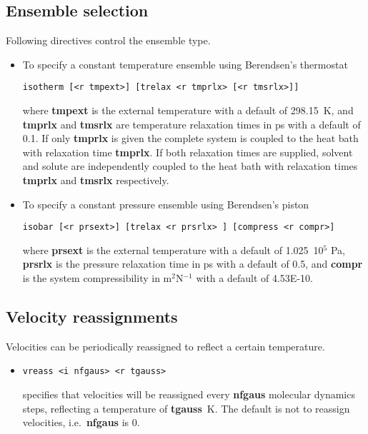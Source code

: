 \subsection{Ensemble selection}
Following directives control the ensemble type.
\begin{itemize}
\item
To specify a constant temperature ensemble using Berendsen's thermostat
\begin{verbatim}
isotherm [<r tmpext>] [trelax <r tmprlx> [<r tmsrlx>]]
\end{verbatim}
where {\bf tmpext} is the external temperature with a default of 298.15~K,
and {\bf tmprlx} and {\bf tmsrlx} are temperature relaxation times in ps 
with a default of 0.1. If only {\bf tmprlx} is given the complete system
is coupled to the heat bath with relaxation time {\bf tmprlx}. If both
relaxation times are supplied, solvent and solute are independently coupled
to the heat bath with relaxation times {\bf tmprlx} and {\bf tmsrlx}
respectively.
\item
To specify a constant pressure ensemble using Berendsen's piston
\begin{verbatim}
isobar [<r prsext>] [trelax <r prsrlx> ] [compress <r compr>]
\end{verbatim}
where {\bf prsext} is the external temperature with a default of 1.025~10$^5$ Pa,
{\bf prsrlx} is the pressure relaxation time in ps with a default of 0.5, and
{\bf compr} is the system compressibility in m$^2$N$^{-1}$ with a
default of 4.53E-10.
\end{itemize}
\subsection{Velocity reassignments}
Velocities can be periodically reassigned to reflect a certain temperature.
\begin{itemize}
\item
\begin{verbatim}
vreass <i nfgaus> <r tgauss>
\end{verbatim}
specifies that velocities will be reassigned every {\bf nfgaus} molecular
dynamics steps, reflecting a temperature of {\bf tgauss}~K. The default
is not to reassign velocities, i.e.\ {\bf nfgaus} is 0.
\end{itemize}
